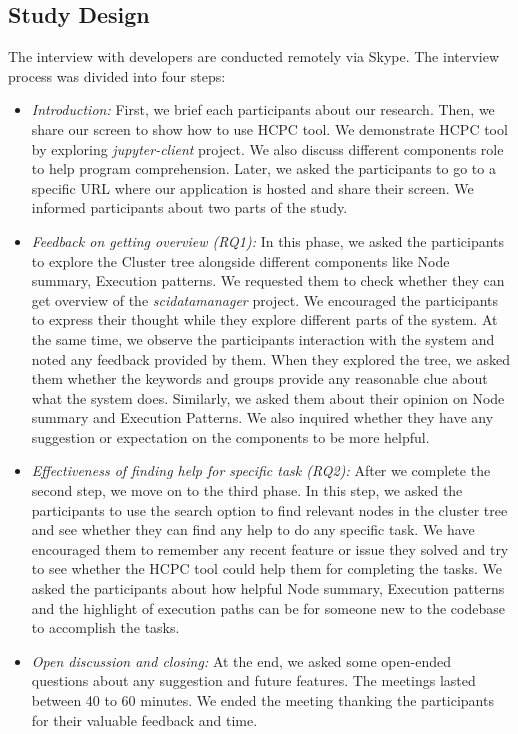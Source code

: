 \subsection{Study Design}
The interview with developers are conducted remotely via Skype. The interview process was divided into four steps:
\begin{itemize}
    \item \emph{Introduction:} First, we brief each participants about our research. Then, we share our screen to show how to use HCPC tool. We demonstrate HCPC tool by exploring \emph{jupyter-client} project. We also discuss different components role to help program comprehension. Later, we asked the participants to go to a specific URL where our application is hosted and share their screen. We informed participants about two parts of the study.   
    \item \emph{Feedback on getting overview (RQ1):} In this phase, we asked the participants to explore the Cluster tree alongside different components like Node summary, Execution patterns. We requested them to check whether they can get overview of the \emph{scidatamanager} project. We encouraged the participants to express their thought while they explore different parts of the system. At the same time, we observe the participants interaction with the system and noted any feedback provided by them. When they explored the tree, we asked them whether the keywords and groups provide any reasonable clue about what the system does. Similarly, we asked them about their opinion on Node summary and Execution Patterns. We also inquired whether they have any suggestion or expectation on the components to be more helpful.
    
    
    \item \emph{Effectiveness of finding help for specific task (RQ2):} After we complete the second step, we move on to the third phase. In this step, we asked the participants to use the search option to find relevant nodes in the cluster tree and see whether they can find any help to do any specific task. We have encouraged them to remember any recent feature or issue they solved and try to see whether the HCPC tool could help them for completing the tasks. We asked the participants about how helpful Node summary, Execution patterns and the highlight of execution paths can be for someone new to the codebase to accomplish the tasks.
    \item \emph{Open discussion and closing:} At the end, we asked some open-ended questions about any suggestion and future features. The meetings lasted between 40 to 60 minutes. We ended the meeting thanking the participants for their valuable feedback and time.

\end{itemize}
